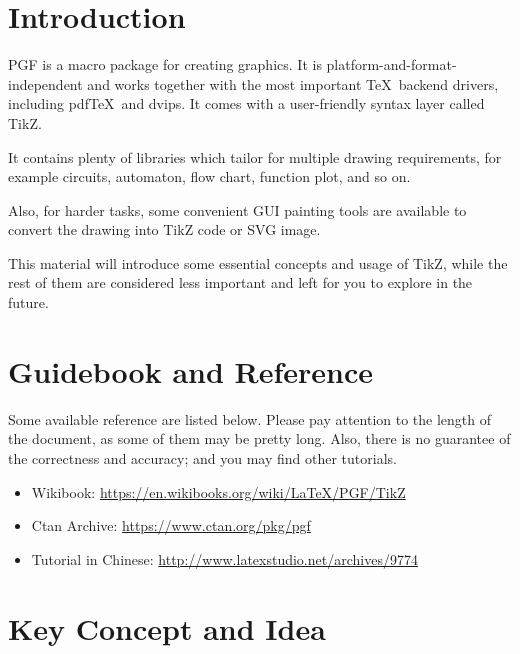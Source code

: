 \documentclass[english]{../TeXTemplate/pkupaper}
\title{\titlemark}
\author{Shlw}
\date{Updated on April 30}
\begin{document}
\maketitle

\section{Introduction}

PGF is a macro package for creating graphics. It is platform-and-format-independent
and works together with the most important \TeX\ backend drivers,
including pdf\TeX\ and dvips.
It comes with a user-friendly syntax layer called TikZ.\par

It contains plenty of libraries which tailor for multiple drawing requirements,
for example circuits, automaton, flow chart, function plot, and so on.\par

Also, for harder tasks, some convenient GUI painting tools are available to
convert the drawing into TikZ code or SVG image.\par

This material will introduce some essential concepts and usage of TikZ, while
the rest of them are considered less important and left for you to explore
in the future.

\section{Guidebook and  Reference}
Some available reference are listed below. Please pay attention to the 
length of the document, as some of them may be pretty long. Also, there
is no guarantee of the correctness and accuracy; and you may find other
tutorials.
\begin{itemize}
\item Wikibook: \url{https://en.wikibooks.org/wiki/LaTeX/PGF/TikZ}
\item Ctan Archive: \url{https://www.ctan.org/pkg/pgf}
\item Tutorial in Chinese: \url{http://www.latexstudio.net/archives/9774}
\end{itemize}

\section{Key Concept and Idea}
\end{document}
